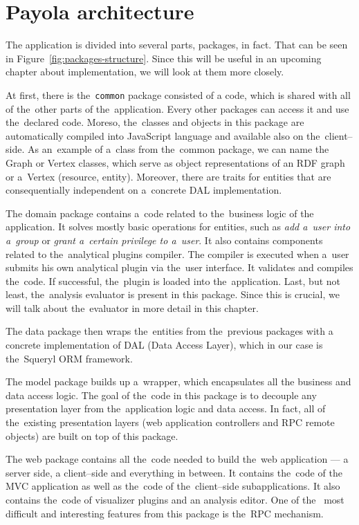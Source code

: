 \section{Payola architecture}
The application is divided into several parts, packages, in fact. That can be 
seen in Figure~\ref{fig:packages-structure}. Since this will be useful in an upcoming
chapter about implementation, we will look at them more closely.

At first, there is the~\texttt{common} package consisted of a code, which is 
shared with all of the~other parts of the~application. Every other packages can 
access it and use the~declared code. Moreso, the~classes and objects 
in this package are automatically compiled into JavaScript language and available
also on the~client--side. As an~example of a~class from the~common package, we
can name the Graph or Vertex classes, which serve as object representations
of an RDF graph or a~Vertex (resource, entity). Moreover, there are traits for 
entities that are consequentially independent on a~concrete DAL implementation.

The domain package contains a~code related to the~business logic of the~
application. It solves mostly basic operations for entities, such as
\emph{add a~user into a~group} or \emph{grant a~certain privilege to a~user}.
It also contains components related to the~analytical plugins compiler. The 
compiler is executed when a~user submits his own analytical plugin via the~user 
interface. It validates and compiles the~code. If successful, the~plugin is 
loaded into the~application. Last, but not least, the~analysis evaluator is 
present in this package. Since this is crucial, we will talk about the~evaluator
in more detail in this chapter.

The data package then wraps the~entities from the~previous packages with a
concrete implementation of DAL (Data Access Layer), which in our case is the~Squeryl
ORM framework.

The model package builds up a~wrapper, which encapsulates all the
business and data access logic. The goal of the~code in this package is to decouple
any presentation layer from the~application logic and data access. In fact,
all of the~existing presentation layers (web application controllers and
RPC remote objects) are built on top of this package. 

The web package contains all the~code needed to build the~web application --- 
a server side, a client--side and everything in between. It contains the~code of 
the MVC application as well as the~code of the~client--side subapplications.
It also contains the~code of visualizer plugins and an analysis editor. One of the~
most difficult and interesting features from this package is the~RPC mechanism.

